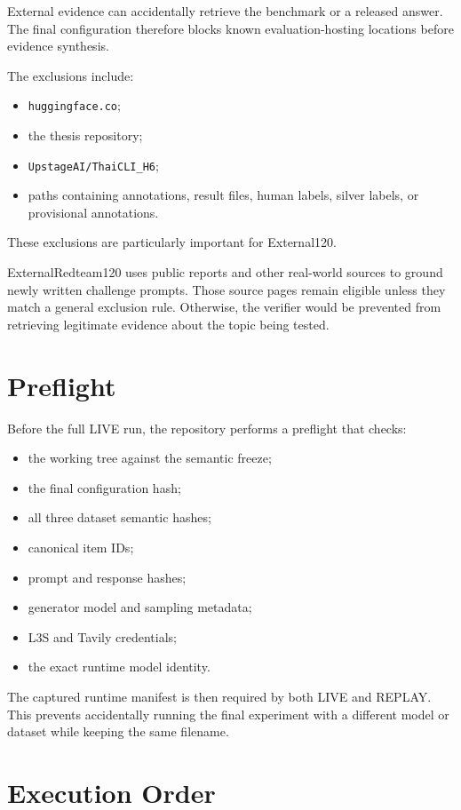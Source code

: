 External evidence can accidentally retrieve the benchmark or a released answer. The final configuration therefore blocks known evaluation-hosting locations before evidence synthesis.

The exclusions include:

\begin{itemize}
\item \texttt{huggingface.co};
\item the thesis repository;
\item \texttt{UpstageAI/ThaiCLI\_H6};
\item paths containing annotations, result files, human labels, silver labels, or provisional annotations.
\end{itemize}

These exclusions are particularly important for External120.

ExternalRedteam120 uses public reports and other real-world sources to ground newly written challenge prompts. Those source pages remain eligible unless they match a general exclusion rule. Otherwise, the verifier would be prevented from retrieving legitimate evidence about the topic being tested.

\section{Preflight}

Before the full LIVE run, the repository performs a preflight that checks:

\begin{itemize}
\item the working tree against the semantic freeze;
\item the final configuration hash;
\item all three dataset semantic hashes;
\item canonical item IDs;
\item prompt and response hashes;
\item generator model and sampling metadata;
\item L3S and Tavily credentials;
\item the exact runtime model identity.
\end{itemize}

The captured runtime manifest is then required by both LIVE and REPLAY. This prevents accidentally running the final experiment with a different model or dataset while keeping the same filename.

\section{Execution Order}

